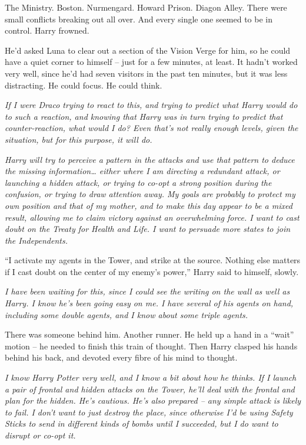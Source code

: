 The Ministry. Boston. Nurmengard. Howard Prison. Diagon Alley. There
were small conflicts breaking out all over. And every single one seemed
to be in control. Harry frowned.

He'd asked Luna to clear out a section of the Vision Verge for him, so
he could have a quiet corner to himself -- just for a few minutes, at
least. It hadn't worked very well, since he'd had seven visitors in the
past ten minutes, but it was less distracting. He could focus. He could
think.

\emph{If I were Draco trying to react to this, and trying to predict
what Harry would do to such a reaction, and knowing that Harry was in
turn trying to predict that counter-reaction, what would I do? Even
that's not really enough levels, given the situation, but for this
purpose, it will do.}

\emph{Harry will try to perceive a pattern in the attacks and use that
pattern to deduce the missing information\ldots{} either where I am
directing a redundant attack, or launching a hidden attack, or trying to
co-opt a strong position during the confusion, or trying to draw
attention away. My goals are probably to protect my own position and
that of my mother, and to make this day appear to be a mixed result,
allowing me to claim victory against an overwhelming force. I want to
cast doubt on the Treaty for Health and Life. I want to persuade more
states to join the Independents.}

``I activate my agents in the Tower, and strike at the source. Nothing
else matters if I cast doubt on the center of my enemy's power,'' Harry
said to himself, slowly.

\emph{I have been waiting for this, since I could see the writing on the
wall as well as Harry. I know he's been going easy on me. I have several
of his agents on hand, including some double agents, and I know about
some triple agents.}

There was someone behind him. Another runner. He held up a hand in a
``wait'' motion -- he needed to finish this train of thought. Then Harry
clasped his hands behind his back, and devoted every fibre of his mind
to thought.

\emph{I know Harry Potter very well, and I know a bit about how he
thinks. If I launch a pair of frontal and hidden attacks on the Tower,
he'll deal with the frontal and plan for the hidden. He's cautious. He's
also prepared -- any simple attack is likely to fail. I don't want to
just destroy the place, since otherwise I'd be using Safety Sticks to
send in different kinds of bombs until I succeeded, but I do want to
disrupt or co-opt it.}

